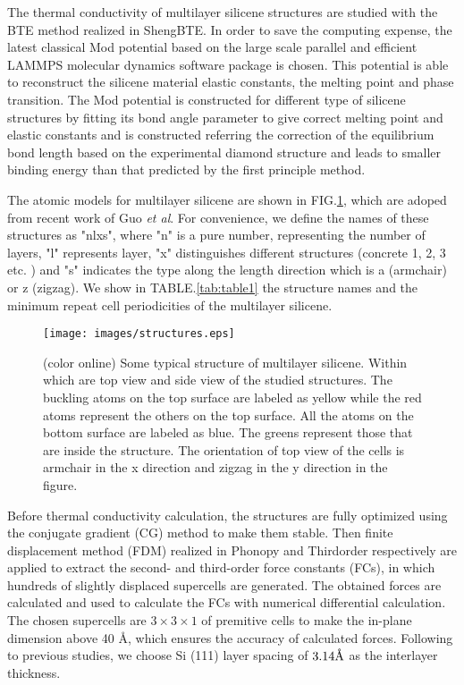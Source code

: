 \documentclass[aps,prb,twocolumn,showpacs,amsmath,amssymb]{revtex4-1}
\newcommand{\angstrom}{\mbox{\normalfont\AA}}
\begin{document}
The thermal conductivity of multilayer silicene structures are studied with the BTE method realized in ShengBTE\cite{Li2014}. In order to save the computing expense, the latest classical Mod potential\cite{Parks2007} based on the large scale parallel and efficient LAMMPS molecular dynamics software package is chosen\cite{Kumagai2007Development}. This potential is able to reconstruct the silicene material elastic constants, the melting point and phase transition. The Mod potential is constructed for different type of silicene structures by fitting its bond angle parameter to give correct melting point and elastic constants and is constructed referring the correction of the equilibrium bond length based on the experimental diamond structure and leads to smaller binding energy than that predicted by the first principle method.

The atomic models for multilayer silicene are shown in FIG.\ref{fig:structures}, which are adoped from recent work of Guo \emph{et al}\cite{Guo2015Structural}. For convenience, we define the names of these structures as "nlxs", where "n" is a pure number, representing the number of layers, "l" represents layer, "x" distinguishes different structures (concrete 1, 2, 3 etc. ) and "s" indicates the type along the length direction which is a (armchair) or z (zigzag). We show in TABLE.\ref{tab:table1} the structure names and  the minimum repeat cell periodicities of the multilayer silicene.

\begin{figure}[b]
  \texttt{[image: images/structures.eps]}
  \caption{\label{fig:structures}  (color online) Some typical structure of multilayer silicene. Within which  are top view and side view of the studied structures. The buckling atoms on the top surface are labeled as yellow while the red atoms represent the others on the top surface. All the atoms on the bottom surface are labeled as blue. The greens represent those that are inside the structure. The orientation of top view of the cells is armchair in the x direction and zigzag in the y direction in the figure.}
\end{figure}

Before thermal conductivity calculation, the  structures are fully optimized using the conjugate gradient (CG) method to make them stable.  Then finite displacement method (FDM) realized in Phonopy\cite{Togo2008} and Thirdorder respectively are applied to extract the second- and third-order force constants (FCs), in which hundreds of  slightly displaced supercells are generated. The obtained forces are calculated and used to calculate the FCs with numerical differential calculation. The chosen supercells are $3 \times 3 \times 1$ of premitive cells to make the in-plane dimension above 40 \angstrom, which ensures  the accuracy of calculated forces. Following to previous studies, we choose Si (111) layer spacing of $3.14 \angstrom$ as the interlayer thickness.
\end{document}
